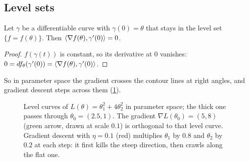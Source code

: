 \begin{notechapter}
\section{Level sets}\label{gradient-tangent-space:sec:level-sets}

\begin{proposition}\label{gradient-tangent-space:prop:level}
Let $\gamma$ be a differentiable curve with $\gamma(0) = \theta$ that stays in the level set
$\{f = f(\theta)\}$. Then $\left\langle \nabla f(\theta), \gamma'(0) \right\rangle = 0$.
\end{proposition}

\begin{proof}
$f(\gamma(t))$ is constant, so its derivative at $0$ vanishes: $0 = df_\theta(\gamma'(0)) = \left\langle \nabla f(\theta), \gamma'(0) \right\rangle$.
\end{proof}

So in parameter space the gradient crosses the contour lines at right angles, and gradient
descent steps across them (\cref{gradient-tangent-space:fig:contours}).

\begin{figure}[ht]
\centering
{}
\caption{Level curves of $L(\theta) = \theta_1^2 + 4\theta_2^2$ in parameter space; the thick one passes through
$\theta_0 = (2.5,1)$. The gradient $\nabla L(\theta_0) = (5, 8)$ (green arrow, drawn at scale $0.1$) is orthogonal to that
level curve. Gradient descent with $\eta = 0.1$ (red) multiplies $\theta_1$ by $0.8$ and $\theta_2$ by $0.2$ at each step:
it first kills the steep direction, then crawls along the flat one.}
\label{gradient-tangent-space:fig:contours}
\end{figure}


\end{notechapter}
